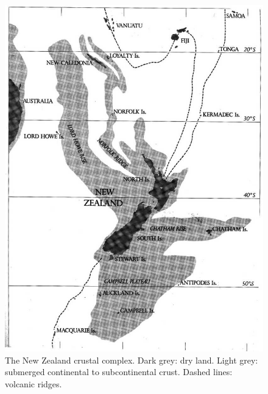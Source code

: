 \begin{figure}[htb]
	\centering
	\begin{minipage}[t]{0.608\textwidth}
		\centering
		\includegraphics[width=.9\textwidth]{graphics/figure2crust.jpg}
		\caption[The New Zealand crustal complex]{The New Zealand crustal complex.
		Dark grey: dry land.
		Light grey: submerged continental to subcontinental crust.
		Dashed lines: volcanic ridges.}%
		\label{fig:2crust}
	\end{minipage}\hfill%
	\begin{minipage}[t]{0.372\textwidth}
    	\centering

\end{minipage}
\end{figure}
